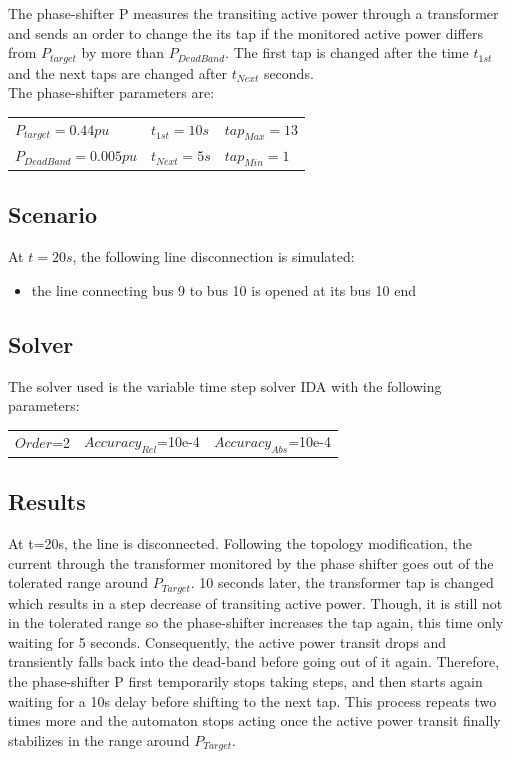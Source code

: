 \documentclass[a4paper, 12pt]{report}
\begin{document}
The phase-shifter P measures the transiting active power through a transformer and sends an order to change the its tap if the monitored active power differs from $P_{target}$ by more than $P_{DeadBand}$. The first tap is changed after the time $t_{1st}$ and the next taps are changed after $t_{Next}$ seconds.\\

The phase-shifter parameters are:
\begin{center}
\begin{tabular}{l|l|l}
   $P_{target}=0.44pu$ & $t_{1st}=10s$ & $tap_{Max}=13$ \\
   $P_{DeadBand}=0.005pu$  & $t_{Next}=5s$ & $tap_{Min}=1$ \\
\end{tabular}
\end{center}

\subsection{Scenario}
At $t=20s$, the following line disconnection is simulated:
\begin{itemize}
\item{the line connecting bus 9 to bus 10 is opened at its bus 10 end}
\end{itemize}

\subsection{Solver}
The solver used is the variable time step solver IDA with the following parameters:
\begin{center}
\begin{tabular}{l|l|l}
   $Order$=2 & $Accuracy_{Rel}$=10e-4 & $Accuracy_{Abs}$=10e-4 \\
\end{tabular}
\end{center}

\newpage
\subsection{Results}

At t=20s, the line is disconnected. Following the topology modification, the current through the transformer monitored by the phase shifter goes out of the tolerated range around $P_{Target}$.  10 seconds later, the transformer tap is changed which results in a step decrease of transiting active power. Though, it is still not in the tolerated range so the phase-shifter increases the tap again, this time only waiting for 5 seconds. Consequently, the active power transit drops and transiently falls back into the dead-band before going out of it again. Therefore, the phase-shifter P first temporarily stops taking steps, and then starts again waiting for a 10s delay before shifting to the next tap. This process repeats two times more and the automaton stops acting once the active power transit finally stabilizes in the range around $P_{Target}$. \\
\end{document}
